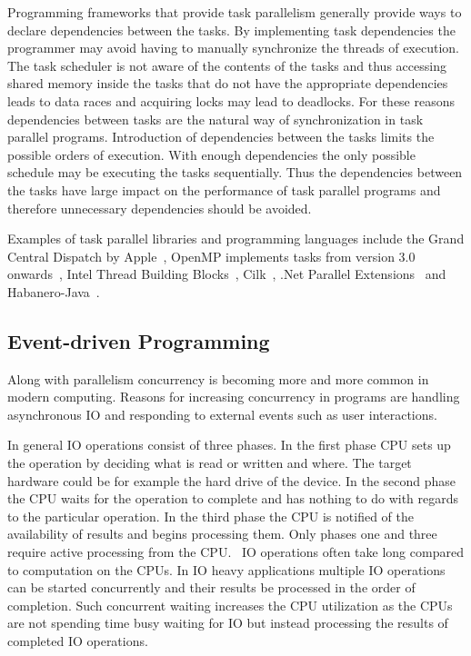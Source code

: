 Programming frameworks that provide task parallelism generally provide ways to declare dependencies between the tasks. By implementing task dependencies the programmer may avoid having to manually synchronize the threads of execution. The task scheduler is not aware of the contents of the tasks and thus accessing shared memory inside the tasks that do not have the appropriate dependencies leads to data races and acquiring locks may lead to deadlocks. For these reasons dependencies between tasks are the natural way of synchronization in task parallel programs. Introduction of dependencies between the tasks limits the possible orders of execution. With enough dependencies the only possible schedule may be executing the tasks sequentially. Thus the dependencies between the tasks have large impact on the performance of task parallel programs and therefore unnecessary dependencies should be avoided.~\cite{hennessy2011computer}

Examples of task parallel libraries and programming languages include the Grand Central Dispatch by Apple~\cite{sakamoto2012grand}, OpenMP implements tasks from version 3.0 onwards~\cite{ayguade2009design}, Intel Thread Building Blocks~\cite{pheatt2008intel}, Cilk~\cite{blumofe1996cilk}, .Net Parallel Extensions~\cite{leijen2009design} and Habanero-Java~\cite{barik2009habanero}.

\subsection{Event-driven Programming}
\label{subsec:event-driven-programming}
Along with parallelism concurrency is becoming more and more common in modern computing. Reasons for increasing concurrency in programs are handling asynchronous IO and responding to external events such as user interactions.

In general IO operations consist of three phases. In the first phase CPU sets up the operation by deciding what is read or written and where. The target hardware could be for example the hard drive of the device. In the second phase the CPU waits for the operation to complete and has nothing to do with regards to the particular operation. In the third phase the CPU is notified of the availability of results and begins processing them. Only phases one and three require active processing from the CPU.~\cite{friesen2015asynchronous} IO operations often take long compared to computation on the CPUs. In IO heavy applications multiple IO operations can be started concurrently and their results be processed in the order of completion. Such concurrent waiting increases the CPU utilization as the CPUs are not spending time busy waiting for IO but instead processing the results of completed IO operations.~\cite{dabek2002event}

